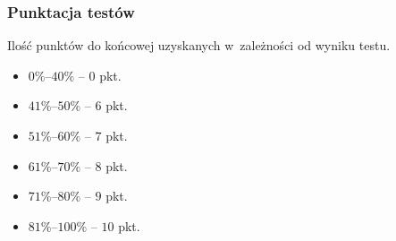 \documentclass[10pt,t]{beamer}
\begin{document}
\begin{frame}
  \frametitle{Punktacja testów}












  Ilość punktów do końcowej uzyskanych w~zależności od wyniku testu.

  \begin{itemize}

  \item $0\%\text{--}40\%$ -- $0$ pkt.

  \item $41\%\text{--}50\%$ -- $6$ pkt.

  \item $51\%\text{--}60\%$ -- $7$ pkt.

  \item $61\%\text{--}70\%$ -- $8$ pkt.

  \item $71\%\text{--}80\%$ -- $9$ pkt.

  \item $81\%\text{--}100\%$ -- $10$ pkt.

  \end{itemize}


\end{frame}
\end{document}
